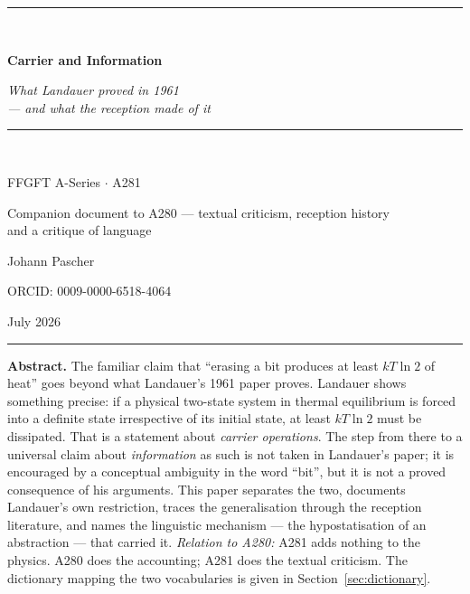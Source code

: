 \documentclass[11pt,a4paper]{article}
\theoremstyle{ffgft}
\begin{document}
\begin{titlepage}
\centering
\vspace*{2.2cm}
{\color{rulecol}\rule{0.5\textwidth}{0.6pt}}\\[1.4cm]
{\color{accent}\Huge\bfseries Carrier and Information\par}
\vspace{1.0cm}
{\large\itshape What Landauer proved in 1961\\ --- and what the reception made of it\par}
\vspace{0.6cm}
{\color{accent2}\rule{0.28\textwidth}{0.4pt}}\\[1.0cm]
{\large FFGFT A-Series $\cdot$ A281\par}
\vspace{0.4cm}
{\normalsize Companion document to A280 --- textual criticism, reception history\\ and a critique of language\par}
\vfill
{\large Johann Pascher\par}
\vspace{0.3cm}
{\footnotesize ORCID: 0009-0000-6518-4064\par}
\vspace{0.2cm}
{\footnotesize July 2026\par}
\vspace{1.4cm}
{\color{rulecol}\rule{0.5\textwidth}{0.6pt}}
\vspace*{1.5cm}
\end{titlepage}

\tableofcontents
\thispagestyle{fancy}
\clearpage

\begingroup\small\noindent
\textbf{Abstract.} The familiar claim that “erasing a bit produces at least
$kT\ln 2$ of heat” goes beyond what Landauer's 1961 paper proves. Landauer shows
something precise: if a physical two-state system in thermal equilibrium is forced
into a definite state irrespective of its initial state, at least $kT\ln 2$ must
be dissipated. That is a statement about \emph{carrier operations}. The step from
there to a universal claim about \emph{information} as such is not taken in
Landauer's paper; it is encouraged by a conceptual ambiguity in the word “bit”,
but it is not a proved consequence of his arguments. This paper separates the two,
documents Landauer's own restriction, traces the generalisation through the
reception literature, and names the linguistic mechanism --- the hypostatisation
of an abstraction --- that carried it. \emph{Relation to A280:} A281 adds nothing
to the physics. A280 does the accounting; A281 does the textual criticism. The
dictionary mapping the two vocabularies is given in
Section~\ref{sec:dictionary}.
\par\endgroup
\end{document}
